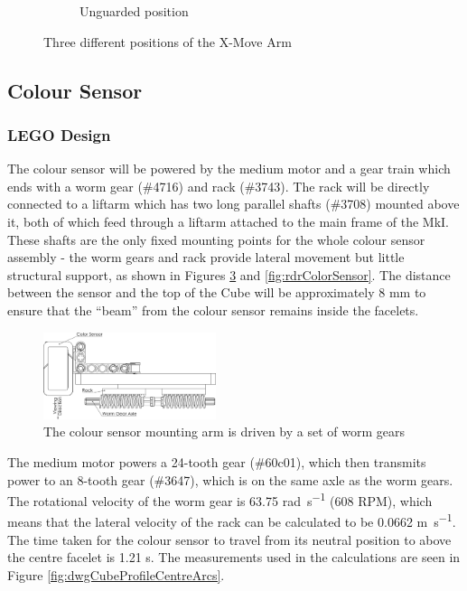 \documentclass{report}
\newcommand{\legopiece}[1]{(\##1)}
\newcommand{\lego}{LEGO }
\begin{document}
\begin{figure}[H]
\begin{subfigure}[b]{0.30811\textwidth}
			\caption{Unguarded position}
			\label{fig:rdrXMoveArmV1_3}
		\end{subfigure}
		\caption{Three different positions of the X-Move Arm}
		\label{fig:rdrXMoveArmV1}
	\end{figure}
	

	\subsection{Colour Sensor}
	
	\subsubsection{\lego Design}
	
	The colour sensor will be powered by the medium motor and a gear train which ends with a worm gear \legopiece{4716} and rack \legopiece{3743}. The rack will be directly connected to a liftarm which has two long parallel shafts \legopiece{3708} mounted above it, both of which feed through a liftarm attached to the main frame of the MkI. These shafts are the only fixed mounting points for the whole colour sensor assembly - the worm gears and rack provide lateral movement but little structural support, as shown in Figures \ref{fig:dwgColorSensor} and \ref{fig:rdrColorSensor}. The distance between the sensor and the top of the Cube will be approximately 8 \si{\milli\metre} to ensure that the \enquote{beam} from the colour sensor remains inside the facelets.
	
	\begin{figure}[H]
		\centering
		\includegraphics[width=0.45\textwidth]{Resources/Images/dwgColorSensor.png}
		\caption{The colour sensor mounting arm is driven by a set of worm gears}
		\label{fig:dwgColorSensor}
	\end{figure}
	
	The medium motor powers a 24-tooth gear \legopiece{60c01}, which then transmits power to an 8-tooth gear \legopiece{3647}, which is on the same axle as the worm gears. The rotational velocity of the worm gear is 63.75 \si{\radian\per\second} (608 RPM), which means that the lateral velocity of the rack can be calculated to be 0.0662 \si{\meter\per\second}. The time taken for the colour sensor to travel from its neutral position to above the centre facelet is 1.21 \si{\second}. The measurements used in the calculations are seen in Figure \ref{fig:dwgCubeProfileCentreArcs}.
	
\end{document}
